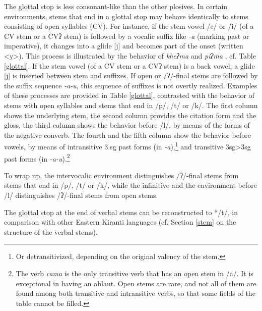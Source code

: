  
The glottal stop is less consonant-like than the other plosives. In certain environments, stems that end in a glottal stop may behave identically to  stems consisting of open syllables (CV). For instance, if the stem vowel /e/ or /i/ (of a CV stem or a CVʔ stem) is followed by a vocalic suffix like \emph{-a} (marking past or imperative), it changes into a glide [j] and becomes part of the onset (written <y>). This process is illustrated by the behavior of \emph{kheʔma}  and \emph{piʔma} , cf. Table \ref{glottal}. If the stem vowel (of a CV stem or a CVʔ stem) is a back vowel, a glide [j] is inserted between stem and suffixes. If open or /ʔ/-final stems are followed by the suffix sequence \emph{-a-u}, this sequence of suffixes is not overtly realized. Examples of these processes are provided in Table \ref{glottal}, contrasted with the behavior of stems with open syllables and stems that end in /p/, /t/ or /k/. The first column shows the underlying stem, the second column provides the citation form and the gloss, the third column shows the behavior before /l/, by means of the forms of the negative converb. The fourth and the fifth column show the behavior before vowels, by means of intransitive {\sc 3.sg} past forms (in \emph{-a}),\footnote{Or detransitivized, depending on the original valency of the stem.} and transitive {\sc 3sg>3sg} past forms (in \emph{-a-u}).\footnote{The verb \emph{cama}  is the only transitive verb that has an open stem in /a/. It is exceptional in having an ablaut. Open stems are rare, and not all of them are found among both transitive and intransitive verbs, so that some fields of the table cannot be filled.}  

To wrap up, the intervocalic environment distinguishes /ʔ/-final stems from stems that end in /p/, /t/ or /k/, while the infinitive and the environment before /l/ distinguishes /ʔ/-final stems from open stems. 

The glottal stop at the end of verbal stems can be reconstructed to */t/, in comparison with other Eastern Kiranti languages (cf. Section \ref{stem} on the structure of the verbal stems). 


